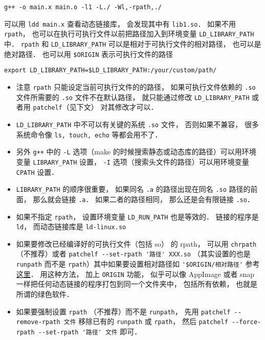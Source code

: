 \begin{lstlisting}[language=none]
g++ -o main.x main.o -l1 -L./ -Wl,-rpath,./
\end{lstlisting}
可以用 \verb|ldd main.x| 查看动态链接库， 会发现其中有 \verb|lib1.so|． 如果不用 \verb|rpath|， 也可以在执行可执行文件以前把路径加入到环境变量 \verb`LD_LIBRARY_PATH` 中． \verb|rpath| 和 \verb|LD_LIBRARY_PATH| 可以是相对于可执行文件的相对路径， 也可以是绝对路径． 也可以用 \verb|$ORIGIN| 表示可执行文件的路径
\begin{lstlisting}[language=none]
export LD_LIBRARY_PATH=$LD_LIBRARY_PATH:/your/custom/path/
\end{lstlisting}
\begin{itemize}
\item 注意 \verb|rpath| 只能设定当前可执行文件的的路径， 如果可执行文件依赖的 \verb|.so| 文件所需要的 \verb|.so| 文件不在默认路径， 就只能通过修改 \verb`LD_LIBRARY_PATH` 或者用 \verb|patchelf|（见下文） 对其修改才可以．
\item \verb|LD_LIBRARY_PATH| 中不可以有关键的系统 \verb|.so| 文件， 否则如果不兼容， 很多系统命令像 \verb|ls, touch, echo| 等都会用不了．
\item 另外 \verb|g++| 中的 \verb|-L| 选项（make 的时候搜索静态或动态库的路径）可以用环境变量 \verb|LIBRARY_PATH| 设置， \verb|-I| 选项（搜索头文件的路径）可以用环境变量 \verb|CPATH| 设置．
\item \verb|LIBRARY_PATH| 的顺序很重要， 如果同名 \verb|.a| 的路径出现在同名 \verb|.so| 路径的前面， 那么就会链接 \verb|.a|． 如果二者的路径相同， 那么还是会有限链接 \verb|.so|．
\item 如果不指定 \verb|rpath|， 设置环境变量 \verb|LD_RUN_PATH| 也是等效的． 链接的程序是 \verb|ld|， 而动态链接库是 \verb|ld-linux.so|
\item 如果要修改已经编译好的可执行文件（包括 so） 的 rpath， 可以用 \verb|chrpath| （不推荐）或者 \verb|patchelf --set-rpath '路径' XXX.so| （其实设置的也是 \verb|runpath| 而不是 \verb|rpath|）其中如果要设置相对路径如 \verb|'$ORIGIN/相对路径'| 参考\href{https://stackoverflow.com/questions/13769141/can-i-change-rpath-in-an-already-compiled-binary}{这里}． 用这种方法， 加上 \verb|ORIGIN| 功能， 似乎可以像 AppImage 或者 snap 一样把任何动态链接的程序打包到同一个文件夹中， 包括所有依赖， 也就是所谓的绿色软件．
\item 如果要强制设置 \verb|rpath| （不推荐）而不是 \verb|runpath|， 先用 \verb|patchelf --remove-rpath 文件| 移除已有的 \verb|runpath| 或 \verb|rpath|， 然后 \verb|patchelf --force-rpath --set-rpath '路径' 文件| 即可．

\end{itemize}

